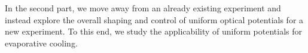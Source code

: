 In the second part, we move away from an already existing experiment and instead explore the overall shaping and control of uniform optical potentials for a new experiment. To this end, we study the applicability of uniform potentials for evaporative cooling.




